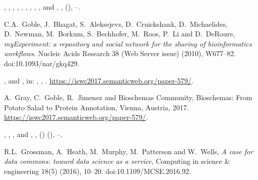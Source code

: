 \documentclass[ds,v1.1.2,openaccess]{iosart2x}%
\begin{document}
\begin{thebibliography}{}
%
\begin{barticle}
,
,
,
,
,
,
,
,
,
 and
,
,
(),
--.
\end{barticle}
%
\OrigBibText
C.A.~Goble,
J.~Bhagat,
S.~Aleksejevs,
D.~Cruickshank,
D.~Michaelides,
D.~Newman,
M.~Borkum,
S.~Bechhofer,
M.~Roos,
P.~Li and
D.~DeRoure,
\textit{{myExperiment}: a repository and social network for the sharing of
bioinformatics workflows}.
Nucleic Acids Research
38 (Web Server issue)
(2010),
W677--82.
doi:10.1093/nar/gkq429.
\endOrigBibText
{}
\endbibitem

%
\begin{bchapter}
,
 and
,
in: ,
,
.
\url{https://iswc2017.semanticweb.org/paper-579/}.
\end{bchapter}
%
\OrigBibText
A.~Gray,
C.~Goble,
R.~Jimenez and
{Bioschemas Community},
Bioschemas: From Potato Salad to Protein Annotation,
Vienna, Austria, 2017.
\url{https://iswc2017.semanticweb.org/paper-579/}.
\endOrigBibText
{}
\endbibitem

%
\begin{barticle}
,
,
,
 and
,
,
()
(),
--.
\end{barticle}
%
\OrigBibText
R.L.~Grossman,
A.~Heath,
M.~Murphy,
M.~Patterson and
W.~Wells,
\textit{A case for data commons: toward data science as a service},
Computing in science \& engineering
18(5)
(2016),
10--20.
doi:10.1109/MCSE.2016.92.
\endOrigBibText
{}
\endbibitem


\end{thebibliography}
\end{document}
